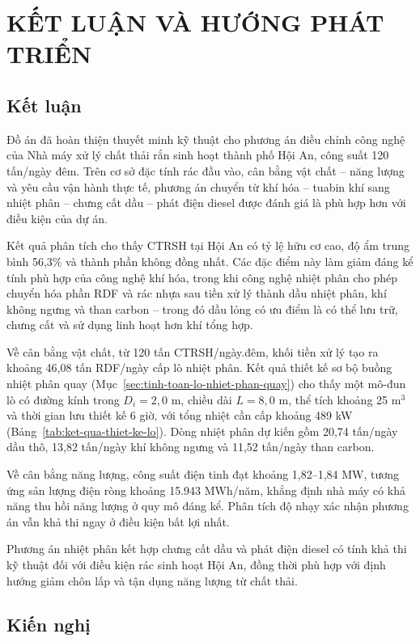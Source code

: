 \documentclass[../main.tex]{subfiles}
\begin{document}
\chapter{KẾT LUẬN VÀ HƯỚNG PHÁT TRIỂN}
\label{chuong6}

\section{Kết luận}

Đồ án đã hoàn thiện thuyết minh kỹ thuật cho phương án điều chỉnh công nghệ của Nhà máy xử lý chất thải rắn sinh hoạt thành phố Hội An, công suất 120 tấn/ngày đêm. Trên cơ sở đặc tính rác đầu vào, cân bằng vật chất -- năng lượng và yêu cầu vận hành thực tế, phương án chuyển từ khí hóa -- tuabin khí sang nhiệt phân -- chưng cất dầu -- phát điện diesel được đánh giá là phù hợp hơn với điều kiện của dự án.

Kết quả phân tích cho thấy CTRSH tại Hội An có tỷ lệ hữu cơ cao, độ ẩm trung bình 56,3\% và thành phần không đồng nhất. Các đặc điểm này làm giảm đáng kể tính phù hợp của công nghệ khí hóa, trong khi công nghệ nhiệt phân cho phép chuyển hóa phần RDF và rác nhựa sau tiền xử lý thành dầu nhiệt phân, khí không ngưng và than carbon -- trong đó dầu lỏng có ưu điểm là có thể lưu trữ, chưng cất và sử dụng linh hoạt hơn khí tổng hợp.

Về cân bằng vật chất, từ 120 tấn CTRSH/ngày.đêm, khối tiền xử lý tạo ra khoảng 46,08 tấn RDF/ngày cấp lò nhiệt phân. Kết quả thiết kế sơ bộ buồng nhiệt phân quay (Mục~\ref{sec:tinh-toan-lo-nhiet-phan-quay}) cho thấy một mô-đun lò có đường kính trong $D_i = 2{,}0$ m, chiều dài $L = 8{,}0$ m, thể tích khoảng 25 m$^3$ và thời gian lưu thiết kế 6 giờ, với tổng nhiệt cần cấp khoảng 489 kW (Bảng~\ref{tab:ket-qua-thiet-ke-lo}). Dòng nhiệt phân dự kiến gồm 20,74 tấn/ngày dầu thô, 13,82 tấn/ngày khí không ngưng và 11,52 tấn/ngày than carbon.

Về cân bằng năng lượng, công suất điện tinh đạt khoảng 1,82--1,84 MW, tương ứng sản lượng điện ròng khoảng 15.943 MWh/năm, khẳng định nhà máy có khả năng thu hồi năng lượng ở quy mô đáng kể. Phân tích độ nhạy xác nhận phương án vẫn khả thi ngay ở điều kiện bất lợi nhất.

Phương án nhiệt phân kết hợp chưng cất dầu và phát điện diesel có tính khả thi kỹ thuật đối với điều kiện rác sinh hoạt Hội An, đồng thời phù hợp với định hướng giảm chôn lấp và tận dụng năng lượng từ chất thải.

\section{Kiến nghị}
\end{document}
